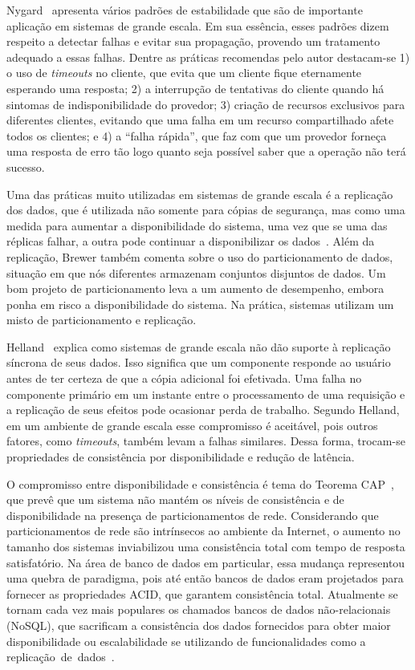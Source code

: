 Nygard~\cite{Nygard2009Release} apresenta vários padrões de estabilidade que são de importante aplicação em sistemas de grande escala. Em sua essência, esses padrões dizem respeito a detectar falhas e evitar sua propagação, provendo um tratamento adequado a essas falhas. Dentre as práticas recomendas pelo autor destacam-se 1) o uso de \emph{timeouts} no cliente, que evita que um cliente fique eternamente esperando uma resposta; 2) a interrupção de tentativas do cliente quando há sintomas de indisponibilidade do provedor; 3) criação de recursos exclusivos para diferentes clientes, evitando que uma falha em um recurso compartilhado afete todos os clientes; e 4) a ``falha rápida'', que faz com que um provedor forneça uma resposta de erro tão logo quanto seja possível saber que a operação não terá sucesso.

Uma das práticas muito utilizadas em sistemas de grande escala é a replicação dos dados, que é utilizada não somente para cópias de segurança, mas como uma medida para aumentar a disponibilidade do sistema, uma vez que se uma das réplicas falhar, a outra pode continuar a disponibilizar os dados~\cite{Brewer2001GiantScale}. Além da replicação, Brewer também comenta sobre o uso do particionamento de dados, situação em que nós diferentes armazenam conjuntos disjuntos de dados. Um bom projeto de particionamento leva a um aumento de desempenho, embora ponha em risco a disponibilidade do sistema. Na prática, sistemas utilizam um misto de particionamento e replicação.

Helland~\cite{Helland2009Quicksand} explica como sistemas de grande escala não dão suporte à replicação síncrona de seus dados. Isso significa que um componente responde ao usuário antes de ter certeza de que a cópia adicional foi efetivada. Uma falha no componente primário em um instante entre o processamento de uma requisição e a replicação de seus efeitos pode ocasionar perda de trabalho. Segundo Helland, em um ambiente de grande escala esse compromisso é aceitável, pois outros fatores, como \emph{timeouts}, também levam a falhas similares. Dessa forma, trocam-se propriedades de consistência por disponibilidade e redução de latência.

O compromisso entre disponibilidade e consistência é tema do Teorema CAP~\cite{Brewer2012Cap}, que prevê que um sistema não mantém os níveis de consistência e de disponibilidade na presença de particionamentos de rede. Considerando que particionamentos de rede são intrínsecos ao ambiente da Internet, o aumento no tamanho dos sistemas inviabilizou uma consistência total com tempo de resposta satisfatório.  Na área de banco de dados em particular, essa mudança representou uma quebra de paradigma, pois até então bancos de dados eram projetados para fornecer as propriedades ACID, que garantem consistência total. Atualmente se tornam cada vez mais populares os chamados bancos de dados não-relacionais (NoSQL), que sacrificam a consistência dos dados fornecidos para obter maior disponibilidade ou escalabilidade se utilizando de funcionalidades como a replicação~de~dados~\cite{Cattell2011NoSql}.

